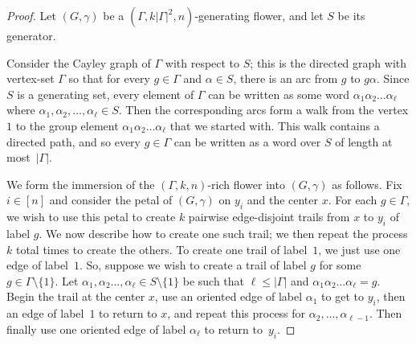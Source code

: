 \documentclass[11pt]{article}
\theoremstyle{definition}
\begin{document}
\begin{proof}
    Let $(G, \gamma)$ be a $(\Gamma, k|\Gamma|^2, n)$-generating flower, and let $S$ be its generator.

    Consider the Cayley graph of $\Gamma$ with respect to $S$; this is the directed graph with vertex-set $\Gamma$ so that for every $g \in \Gamma$ and $\alpha \in S$, there is an arc from $g$ to $g\alpha$. Since $S$ is a generating set, every element of $\Gamma$ can be written as some word $\alpha_1\alpha_2 \ldots \alpha_\ell$ where $\alpha_1,\alpha_2, \ldots, \alpha_\ell \in S$. Then the corresponding arcs form a walk from the vertex $1$ to the group element $\alpha_1\alpha_2 \ldots \alpha_\ell$ that we started with. This walk contains a directed path, and so every $g \in \Gamma$ can be written as a word over $S$ of length at most~$|\Gamma|$.

    We form the immersion of the $(\Gamma, k, n)$-rich flower into $(G, \gamma)$ as follows. Fix $i \in [n]$ and consider the petal of $(G, \gamma)$ on $y_i$ and the center $x$. For each $g \in \Gamma$, we wish to use this petal to create $k$ pairwise edge-disjoint trails from $x$ to $y_i$ of label $g$. We now describe how to create one such trail; we then repeat the process $k$ total times to create the others. To create one trail of label~$1$, we just use one edge of label~$1$. So, suppose we wish to create a trail of label $g$ for some $g \in \Gamma\setminus \{1\}$. Let $\alpha_1,\alpha_2 \ldots, \alpha_\ell \in S \setminus \{1\}$ be such that $\ell \leq |\Gamma|$ and $\alpha_1\alpha_2 \ldots \alpha_\ell=g$. Begin the trail at the center $x$, use an oriented edge of label $\alpha_1$ to get to $y_i$, then an edge of label~$1$ to return to $x$, and repeat this process for $\alpha_2, \ldots, \alpha_{\ell-1}$. Then finally use one oriented edge of label $\alpha_\ell$ to return to~$y_i$. 
    

\end{proof}
\end{document}
